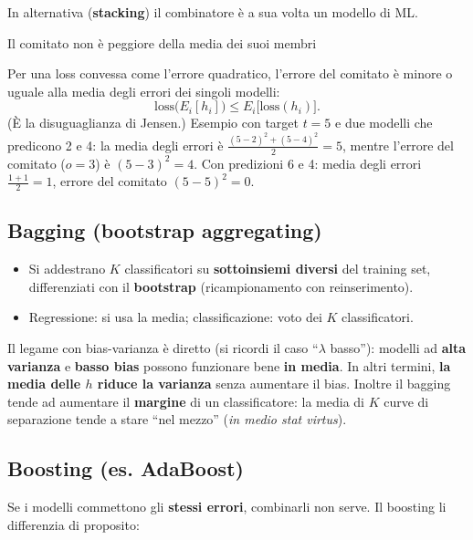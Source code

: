 In alternativa (\textbf{stacking}) il combinatore è a sua volta un
modello di ML.

\begin{boxtheorem}{Il comitato non è peggiore della media dei suoi membri}

Per una loss convessa come l'errore quadratico, l'errore del comitato è
minore o uguale alla media degli errori dei singoli modelli: \[
\text{loss}\big(E_i[h_i]\big) \le E_i\big[\text{loss}(h_i)\big].
\] (È la disuguaglianza di Jensen.) Esempio con target \(t = 5\) e due
modelli che predicono 2 e 4: la media degli errori è
\(\frac{(5-2)^2 + (5-4)^2}{2} = 5\), mentre l'errore del comitato
(\(o = 3\)) è \((5-3)^2 = 4\). Con predizioni 6 e 4: media degli errori
\(\frac{1 + 1}{2} = 1\), errore del comitato \((5-5)^2 = 0\).

\end{boxtheorem}

\subsection{Bagging (bootstrap
aggregating)}\label{bagging-bootstrap-aggregating}

\begin{itemize}
\tightlist
\item
  Si addestrano \(K\) classificatori su \textbf{sottoinsiemi diversi}
  del training set, differenziati con il \textbf{bootstrap}
  (ricampionamento con reinserimento).
\item
  Regressione: si usa la media; classificazione: voto dei \(K\)
  classificatori.
\end{itemize}

Il legame con bias-varianza è diretto (si ricordi il caso ``\(\lambda\)
basso''): modelli ad \textbf{alta varianza} e \textbf{basso bias}
possono funzionare bene \textbf{in media}. In altri termini, \textbf{la
media delle \(h\) riduce la varianza} senza aumentare il bias. Inoltre
il bagging tende ad aumentare il \textbf{margine} di un classificatore:
la media di \(K\) curve di separazione tende a stare ``nel mezzo''
(\emph{in medio stat virtus}).

\subsection{Boosting (es. AdaBoost)}\label{boosting-es.-adaboost}

Se i modelli commettono gli \textbf{stessi errori}, combinarli non
serve. Il boosting li differenzia di proposito:

